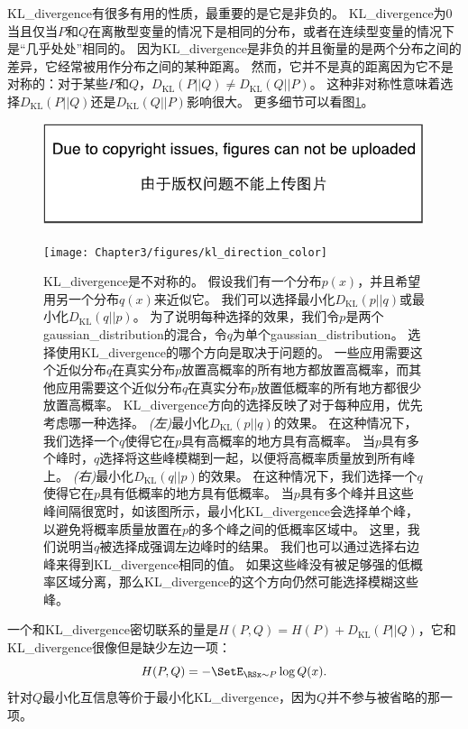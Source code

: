 \gls{KL_divergence}有很多有用的性质，最重要的是它是非负的。
\gls{KL_divergence}为0当且仅当$P$和$Q$在离散型变量的情况下是相同的分布，或者在连续型变量的情况下是``几乎处处''相同的。
因为\gls{KL_divergence}是非负的并且衡量的是两个分布之间的差异，它经常被用作分布之间的某种距离。
然而，它并不是真的距离因为它不是对称的：对于某些$P$和$Q$，$D_\text{KL}(P||Q) \ne D_\text{KL}(Q||P)$。
这种非对称性意味着选择$D_\text{KL}(P||Q)$还是$D_\text{KL}(Q||P)$影响很大。
更多细节可以看图\ref{fig:chap3_kl_direction_color}。
\begin{figure}[!htb]
\ifOpenSource
\centerline{\includegraphics{figure.pdf}}
\else
\centerline{\texttt{[image: Chapter3/figures/kl\_direction\_color]}}
\fi
\caption{\gls{KL_divergence}是不对称的。
假设我们有一个分布$p(x)$，并且希望用另一个分布$q(x)$来近似它。
我们可以选择最小化$D_\text{KL}(p||q)$或最小化$D_\text{KL}(q||p)$。
为了说明每种选择的效果，我们令$p$是两个\gls{gaussian_distribution}的混合，令$q$为单个\gls{gaussian_distribution}。
选择使用\gls{KL_divergence}的哪个方向是取决于问题的。
一些应用需要这个近似分布$q$在真实分布$p$放置高概率的所有地方都放置高概率，而其他应用需要这个近似分布$q$在真实分布$p$放置低概率的所有地方都很少放置高概率。 
\gls{KL_divergence}方向的选择反映了对于每种应用，优先考虑哪一种选择。
\emph{(左)}最小化$D_\text{KL}(p||q)$的效果。
在这种情况下，我们选择一个$q$使得它在$p$具有高概率的地方具有高概率。
当$p$具有多个峰时，$q$选择将这些峰模糊到一起，以便将高概率质量放到所有峰上。 
\emph{(右)}最小化$D_\text{KL}(q||p)$的效果。
在这种情况下，我们选择一个$q$使得它在$p$具有低概率的地方具有低概率。
当$p$具有多个峰并且这些峰间隔很宽时，如该图所示，最小化\gls{KL_divergence}会选择单个峰，以避免将概率质量放置在$p$的多个峰之间的低概率区域中。
这里，我们说明当$q$被选择成强调左边峰时的结果。
我们也可以通过选择右边峰来得到\gls{KL_divergence}相同的值。
如果这些峰没有被足够强的低概率区域分离，那么\gls{KL_divergence}的这个方向仍然可能选择模糊这些峰。}
\label{fig:chap3_kl_direction_color}
\end{figure}



一个和\gls{KL_divergence}密切联系的量是$H(P, Q) = H(P) + D_\text{KL}(P||Q)$，它和\gls{KL_divergence}很像但是缺少左边一项：
\begin{equation}
H(P, Q) = -\SetE_{\RSx\sim P} \log Q(x).
\end{equation}
针对$Q$最小化互信息等价于最小化\gls{KL_divergence}，因为$Q$并不参与被省略的那一项。

